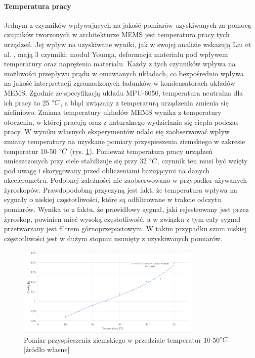 	\paragraph*{Temperatura pracy}
	Jednym z czynników wpływających na jakość pomiarów uzyskiwanych za pomocą czujników tworzonych w architekturze MEMS jest temperatura pracy tych urządzeń.
	Jej wpływ na uzyskiwane wyniki, jak w swojej analizie wskazują Liu et al. \cite{Liu2007, Liu2015}, mają 3 czynniki: moduł Younga, deformacja materiału pod wpływem temperatury oraz naprężenia materiału. Każdy z tych czynników wpływa na możliwości przepływu prądu w omawianych układach, co bezpośrednio wpływa na jakość interpretacji zgromadzonych ładunków w kondensatorach układów MEMS. Zgodnie ze specyfikacją układu MPU-6050, temperatura neutralna dla ich pracy to 25 $\degree C$, a błąd związany z temperaturą urządzenia zmienia się nieliniowo. Zmiana temperatury układów MEMS wynika z temperatury otoczenia, w której pracują oraz z naturalnego wydzielania się ciepła podczas pracy. W wyniku własnych eksperymentów udało się zaobserwować wpływ zmiany temperatury na uzyskane pomiary przyspieszenia ziemskiego w zakresie temperatur 10-50 $\degree C$ (rys. \ref{fig:characteristics:imu:temp}). Ponieważ temperatura pracy urządzeń umieszczonych przy ciele stabilizuje się przy 32 $\degree C$, czynnik ten musi być wzięty pod uwagę i skorygowany przed obliczeniami bazującymi na danych akcelerometru. Podobnej zależności nie zaobserwowano w przypadku używanych żyroskopów. Prawdopodobną przyczyną jest fakt, że temperatura wpływa na sygnały o niskiej częstotliwości, które są odfiltrowane w trakcie odczytu pomiarów. Wynika to z faktu, że prawidłowy sygnał, jaki rejestrowany jest przez żyroskop, powinien mieć wysoką częstotliwość, a w związku z tym cały sygnał przetwarzany jest filtrem górnoprzepustowym. W takim przypadku szum niskiej częstotliwości jest w dużym stopniu usunięty z uzyskiwanych pomiarów.
		
	\begin{figure}
		\centering
		\includegraphics[width=0.8\textwidth]{images/temp.png}
		\caption{Pomiar przyspieszenia ziemskiego w przedziale temperatur 10-50$\degree C$ [źródło własne]}
		\label{fig:characteristics:imu:temp}
	\end{figure}
		
